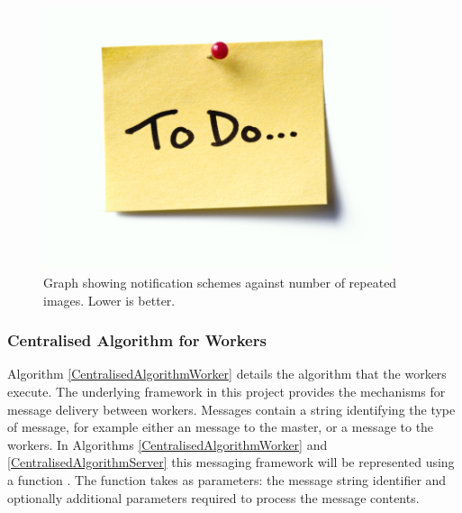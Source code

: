 \documentclass[12pt]{article}
\begin{document}
\begin{figure}[H]
  \centering
  \includegraphics[width=4in]{todo}
  \caption[]{Graph showing notification schemes against number of repeated images. Lower is better.}
  \label{EventProcessingPerformance}
\end{figure}

\subsubsection{Centralised Algorithm for Workers}

Algorithm \ref{CentralisedAlgorithmWorker} details the algorithm that the workers execute. The underlying framework in this project provides the mechanisms for message delivery between workers. Messages contain a string identifying the type of message, for example either an  message to the master, or a  message to the workers.
\newline
In Algorithms \ref{CentralisedAlgorithmWorker} and \ref{CentralisedAlgorithmServer} this messaging framework will be represented using a function . The  function takes as parameters: the message string identifier and optionally additional parameters required to process the message contents.
\newline
\end{document}
